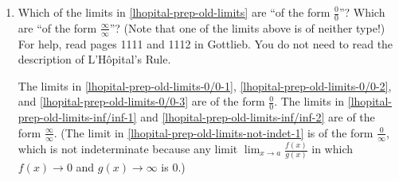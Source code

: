 \documentclass{article}
\begin{document}
\begin{enumerate}
\begin{enumerate}
\begin{enumerate}
        \begin{solution}
          As $x \to 1$, both the numerator and denominator $\to 0$, so we
          should try to factor and cancel:
          \[ \lim_{x \to 1} \frac{x^2 - 1}{3x - 3} = \lim_{x \to 1}
          \frac{\cancel{(x - 1)} (x + 1)}{3 \cancel{(x - 1)}} = \lim_{x
            \to 1} \frac{x + 1}{3} = \boxed{\frac{2}{3}}.\]
        \end{solution}

      \item \label{lhopital-prep-old-limits-0/0-3}
        \begin{problem}[\vfill]
          $\displaystyle \lim_{x\to 0} \frac{2x^3}{x^2+x}$
        \end{problem}

        \begin{solution}
          As $x \to 0$, both the numerator and denominator $\to 0$, so we
          should try to factor and cancel:
          \[ \lim_{x \to 0} \frac{2x^3}{x^2 + x} = \lim_{x \to 0}
          \frac{2x^2 \cdot \cancel{x}}{\cancel{x} (x + 1)} = \lim_{x \to
            0} \frac{2x^2}{x + 1} = \frac{0}{1} = \boxed{0}.\]
        \end{solution}

    \end{enumerate}

  \item
    \begin{problem}[\vfill]
      Which of the limits in
      \ref{lhopital-prep-old-limits} are ``of the form $\frac{0}{0}$''?  Which are ``of the form
      $\frac{\infty}{\infty}$''? (Note that one of the limits above is of
      neither type!) For help, read pages 1111 and 1112 in Gottlieb. You do not need to read
      the description of L'H\^opital's Rule. 
    \end{problem}

    \begin{solution}
      \renewcommand\enumiiprefix[2]{} %
      The limits in \ref{lhopital-prep-old-limits-0/0-1},
      \ref{lhopital-prep-old-limits-0/0-2}, and
      \ref{lhopital-prep-old-limits-0/0-3} are of the form
      $\frac{0}{0}$. The limits in
      \ref{lhopital-prep-old-limits-inf/inf-1} and
      \ref{lhopital-prep-old-limits-inf/inf-2} are of the form
      $\frac{\infty}{\infty}$. (The limit in
      \ref{lhopital-prep-old-limits-not-indet-1} is of the form
      $\frac{0}{\infty}$, which is not indeterminate because any limit
      $\displaystyle \lim_{x \to a} \frac{f(x)}{g(x)}$ in which $f(x) \to
      0$ and $g(x) \to \infty$ is 0.)
    \end{solution}


\end{enumerate}
\end{enumerate}
\end{document}
